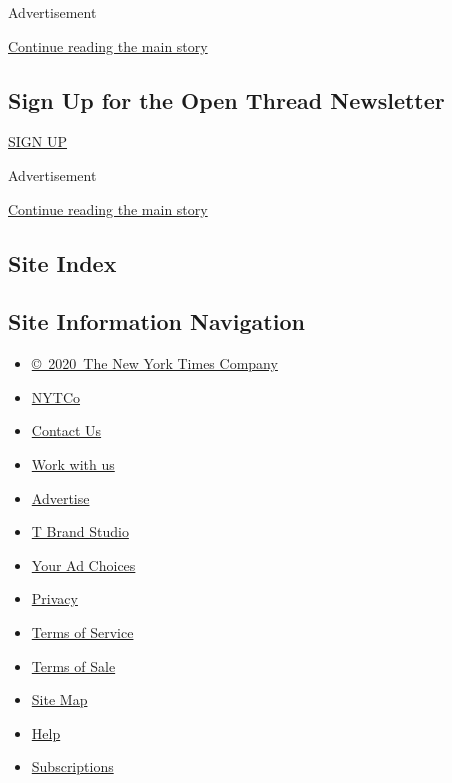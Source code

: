 Advertisement

\protect\hyperlink{after-mid2}{Continue reading the main story}

\hypertarget{sign-up-for-the-open-thread-newsletter}{%
\subsection{Sign Up for the Open Thread
Newsletter}\label{sign-up-for-the-open-thread-newsletter}}

\href{/newsletters/signup/TZ}{SIGN UP}

Advertisement

\protect\hyperlink{after-mktg}{Continue reading the main story}

\hypertarget{site-index}{%
\subsection{Site Index}\label{site-index}}

\hypertarget{site-information-navigation}{%
\subsection{Site Information
Navigation}\label{site-information-navigation}}

\begin{itemize}
\tightlist
\item
  \href{https://help.nytimes.com/hc/en-us/articles/115014792127-Copyright-notice}{©~2020~The
  New York Times Company}
\end{itemize}

\begin{itemize}
\tightlist
\item
  \href{https://www.nytco.com/}{NYTCo}
\item
  \href{https://help.nytimes.com/hc/en-us/articles/115015385887-Contact-Us}{Contact
  Us}
\item
  \href{https://www.nytco.com/careers/}{Work with us}
\item
  \href{https://nytmediakit.com/}{Advertise}
\item
  \href{http://www.tbrandstudio.com/}{T Brand Studio}
\item
  \href{https://www.nytimes.com/privacy/cookie-policy\#how-do-i-manage-trackers}{Your
  Ad Choices}
\item
  \href{https://www.nytimes.com/privacy}{Privacy}
\item
  \href{https://help.nytimes.com/hc/en-us/articles/115014893428-Terms-of-service}{Terms
  of Service}
\item
  \href{https://help.nytimes.com/hc/en-us/articles/115014893968-Terms-of-sale}{Terms
  of Sale}
\item
  \href{https://spiderbites.nytimes.com}{Site Map}
\item
  \href{https://help.nytimes.com/hc/en-us}{Help}
\item
  \href{https://www.nytimes.com/subscription?campaignId=37WXW}{Subscriptions}
\end{itemize}
